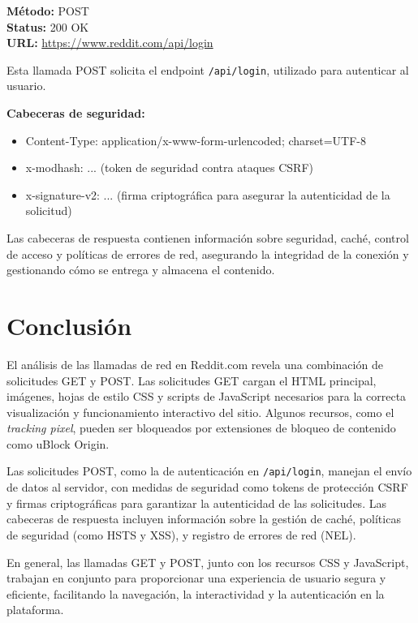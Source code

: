 \documentclass[a4paper,12pt]{article}
\begin{document}
\textbf{Método:} POST \\
\textbf{Status:} 200 OK \\
\textbf{URL:} \url{https://www.reddit.com/api/login}

Esta llamada POST solicita el endpoint \texttt{/api/login}, utilizado para autenticar al usuario. 

\textbf{Cabeceras de seguridad:}
\begin{itemize}
    \item Content-Type: application/x-www-form-urlencoded; charset=UTF-8
    \item x-modhash: ... (token de seguridad contra ataques CSRF)
    \item x-signature-v2: ... (firma criptográfica para asegurar la autenticidad de la solicitud)
\end{itemize}

Las cabeceras de respuesta contienen información sobre seguridad, caché, control de acceso y políticas de errores de red, asegurando la integridad de la conexión y gestionando cómo se entrega y almacena el contenido.

\section*{Conclusión}

El análisis de las llamadas de red en Reddit.com revela una combinación de solicitudes GET y POST. Las solicitudes GET cargan el HTML principal, imágenes, hojas de estilo CSS y scripts de JavaScript necesarios para la correcta visualización y funcionamiento interactivo del sitio. Algunos recursos, como el \textit{tracking pixel}, pueden ser bloqueados por extensiones de bloqueo de contenido como uBlock Origin.

Las solicitudes POST, como la de autenticación en \texttt{/api/login}, manejan el envío de datos al servidor, con medidas de seguridad como tokens de protección CSRF y firmas criptográficas para garantizar la autenticidad de las solicitudes. Las cabeceras de respuesta incluyen información sobre la gestión de caché, políticas de seguridad (como HSTS y XSS), y registro de errores de red (NEL).

En general, las llamadas GET y POST, junto con los recursos CSS y JavaScript, trabajan en conjunto para proporcionar una experiencia de usuario segura y eficiente, facilitando la navegación, la interactividad y la autenticación en la plataforma.
\end{document}
